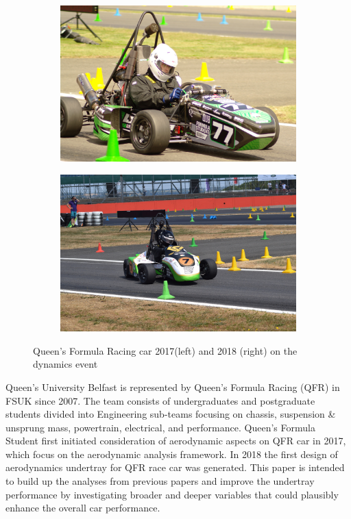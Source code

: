 \begin{figure}[!ht]
\begin{center}
%    
  \begin{subfigure}[b]{0.4\textwidth}
    \includegraphics[scale=0.05]{Figures/QFR17PHOTO.JPG}
  \end{subfigure}
  \begin{subfigure}[b]{0.4\textwidth}
    \includegraphics[scale=0.05]{Figures/QFR18PHOTO.jpg}
  \end{subfigure}
%  
  \caption{Queen's Formula Racing car 2017(left) and 2018 (right) on the dynamics event}
    \label{fig:1}
\end{center}
\end{figure}


\noindent Queen's University Belfast is represented by Queen's Formula Racing (QFR) in FSUK since 2007. The team consists of undergraduates and postgraduate students divided into Engineering sub-teams focusing on chassis, suspension \& unsprung mass, powertrain, electrical, and performance. Queen's Formula Student first initiated consideration of aerodynamic aspects on QFR car in 2017, which focus on the aerodynamic analysis framework\cite{Corr2017MechanicalAuthor}. In 2018 the first design of aerodynamics undertray for QFR race car was generated\cite{McKeown2018DesignCar}. This paper is intended to build up the analyses from previous papers and improve the undertray performance by investigating broader and deeper variables that could plausibly enhance the overall car performance. 

